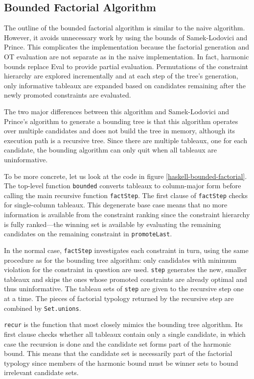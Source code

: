 \documentclass[11pt]{article}
\begin{document}
\subsection{Bounded Factorial Algorithm}
The outline of the bounded factorial algorithm is similar to the naive
algorithm. However, it avoids unnecessary work by using the bounds of
Samek-Lodovici and Prince. This complicates the implementation because
the factorial generation and OT evaluation are not separate as in the
naive implementation. In fact, harmonic bounds replace {\sc Eval} to
provide partial evaluation. Permutations of the constraint hierarchy are explored
incrementally and at each step of the tree's generation, only informative tableaux
are expanded based on candidates remaining after the newly promoted
constraints are evaluated.

The two major differences between this algorithm and Samek-Lodovici
and Prince's algorithm to generate a bounding tree is that this
algorithm operates over multiple candidates and does not build the
tree in memory, although its execution path is a recursive tree. Since
there are multiple tableaux, one for each candidate, the bounding
algorithm can only quit when all tableaux are uninformative.

To be more concrete, let us look at the code in figure
\ref{haskell-bounded-factorial}. The top-level
function {\tt bounded} converts tableaux to column-major form before
calling the main recursive function {\tt factStep}. The first
clause of {\tt factStep} checks for single-column tableaux. This
degenerate base case means that no more information is available from the
constraint ranking since the constraint hierarchy is fully
ranked---the winning set is available by evaluating the remaining
candidates on the remaining constraint in {\tt promoteLast}.

In the normal case, {\tt factStep} investigates each constraint in
turn, using the same procedure as for the bounding tree algorithm:
only candidates with minimum violation for the constraint in question
are used. {\tt step} generates the new, smaller tableaux and skips the
ones whose promoted constraints are already optimal and thus
uninformative. The tableau sets
of {\tt step} are given to the recursive step one at a time. The
pieces of factorial typology returned by the recursive step are
combined by {\tt Set.unions}.

{\tt recur} is the function that most closely mimics the
bounding tree algorithm. Its first clause checks whether all tableaux
contain only a single candidate, in which case the recursion is done
and the candidate set forms part of the harmonic bound.
This means that the candidate set is necessarily part of the
factorial typology since members of the harmonic bound must be winner
sets to bound irrelevant candidate sets.
\end{document}
